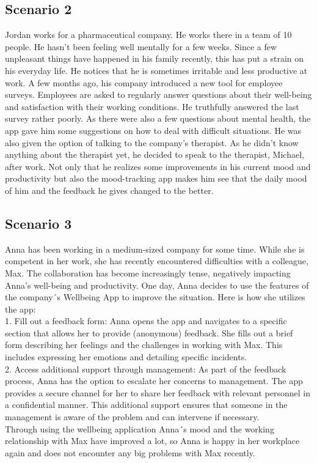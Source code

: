 \documentclass[11pt]{article}
\begin{document}
\subsection{Scenario 2}
Jordan works for a pharmaceutical company. He works there in a team of 10 people. He hasn't been feeling well mentally for a few weeks. Since a few unpleasant things have happened in his family recently, this has put a strain on his everyday life. He notices that he is sometimes irritable and less productive at work. A few months ago, his company introduced a new tool for employee surveys. Employees are asked to regularly answer questions about their well-being and satisfaction with their working conditions. He truthfully answered the last survey rather poorly. As there were also a few questions about mental health, the app gave him some suggestions on how to deal with difficult situations. He was also given the option of talking to the company's therapist. As he didn't know anything about the therapist yet, he decided to speak to the therapist, Michael, after work. Not only that he realizes some improvements in his current mood and productivity but also the mood-tracking app makes him see that the daily mood of him and the feedback he gives changed to the better.

\subsection{Scenario 3}
Anna has been working in a medium-sized company for some time. While she is competent in her work, she has recently encountered difficulties with a colleague, Max. The collaboration has become increasingly tense, negatively impacting Anna's well-being and productivity.
One day, Anna decides to use the features of the company´s Wellbeing App to improve the situation. Here is how she utilizes the app:\\
1. Fill out a feedback form: 
Anna opens the app and navigates to a specific section that allows her to provide (anonymous) feedback. She fills out a brief form describing her feelings and the challenges in working with Max. This includes expressing her emotions and detailing specific incidents.\\
2. Access additional support through management: 
As part of the feedback process, Anna has the option to escalate her concerns to management. The app provides a secure channel for her to share her feedback with relevant personnel in a confidential manner. This additional support ensures that someone in the management is aware of the problem and can intervene if necessary.\\
Through using the wellbeing application Anna´s mood and the working relationship with Max have improved a lot, so Anna is happy in her workplace again and does not encounter any big problems with Max recently. 
\end{document}
